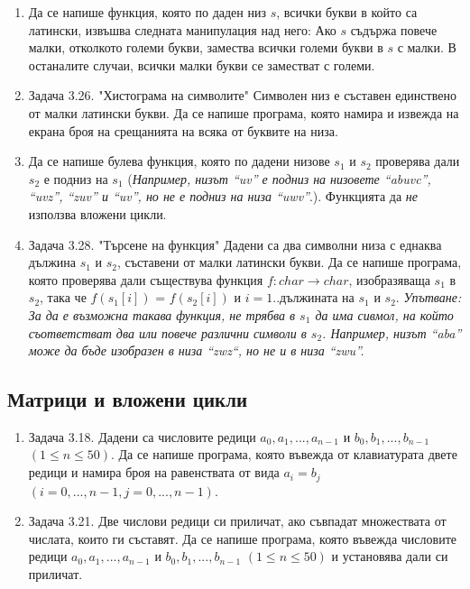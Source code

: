 \documentclass[12pt,a4paper]{article}
\begin{document}
{\begin{enumerate}[resume]
  \item Да се напише функция, която по даден низ $s$, всички букви в който са латински, извъшва следната манипулация над него: Ако $s$ съдържа повече малки, отколкото големи букви, замества всички големи букви в $s$ с малки. В останалите случаи, всички малки букви се заместват с големи.

	\item Задача 3.26. "Хистограма на символите" \cite{sbornik} Символен низ е съставен единствено от малки латински букви. Да се напише програма, която намира и извежда на екрана броя на срещанията на всяка от буквите на низа.

  \item Да се напише булева функция, която по дадени низове $s_1$ и $s_2$ проверява дали $s_2$ е подниз на $s_1$ (\textit{Например, низът ``uv'' е подниз на низовете ``abuvc'', ``uvz'', ``zuv'' и ``uv'', но не е подниз на низа ``uwv''}.). Функцията да \emph{не} използва вложени цикли.

  \item Задача 3.28. "Търсене на функция" \cite{sbornik} Дадени са два символни низа с еднаква дължина $s_1$ и $s_2$, съставени от малки латински букви. Да се напише програма, която проверява дали съществува функция $f:char \rightarrow char$, изобразяваща $s_1$ в $s_2$, така че $f(s_1[i])$ = $f(s_2[i])$ и $i=1..$дължината на $s_1$ и $s_2$. \textit{Упътване: За да е възможна такава функция, не трябва в $s_1$ да има сивмол, на който съответстват два или повече различни символи в $s_2$. Например, низът ``aba'' може да бъде изобразен в низа ``zwz``, но не и в низа ``zwu''.}

\end{enumerate}


\pagebreak

\subsection {Матрици и вложени цикли}

\begin{enumerate}[resume]

	\item Задача 3.18. \cite{sbornik} Дадени са числовите редици $a_0, a_1, ..., a_{n-1}$ и $b_0, b_1, ..., b_{n-1}$ $(1 \leq n \leq 50)$. Да се напише програма, която въвежда от клавиатурата двете редици и намира броя на равенствата от вида $a_i = b_j$ $(i = 0, ..., n-1, j = 0, ..., n-1)$.

	\item Задача 3.21. \cite{sbornik} Две числови редици си приличат, ако съвпадат множествата от числата, които ги съставят. Да се напише програма, която въвежда числовите редици $a_0, a_1, ..., a_{n-1}$ и $b_0, b_1, ..., b_{n-1}$ $(1 \leq n \leq 50)$ и установява дали си приличат.


\end{enumerate}}
\end{document}
